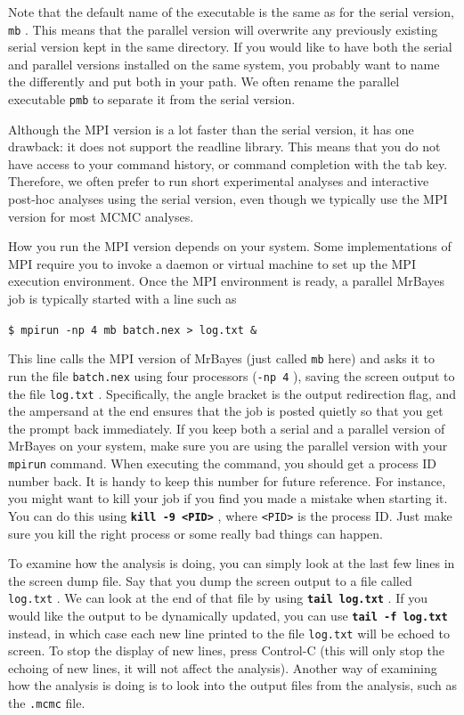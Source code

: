 \documentclass[12pt]{book}
\newcommand{\ttt}[1]{\texttt{#1} }
\newcommand{\tb}[1]{\texttt{\textbf{#1}} }
\begin{document}
Note that the default name of the executable is the same as for the serial version, \ttt{mb}. This means
that the parallel version will overwrite any previously existing serial version kept in the same directory. If you
would like to have both the serial and parallel versions installed on the same system, you probably want to
name the differently and put both in your path. We often rename the parallel executable \ttt{pmb} to
separate it from the serial version.

Although the MPI version is a lot faster than the serial version, it has one drawback: it does not support the readline
library. This means that you do not have access to your command history, or command completion with the tab key.
Therefore, we often prefer to run short experimental analyses and interactive post-hoc analyses using the serial
version, even though we typically use the MPI version for most MCMC analyses.

How you run the MPI version depends on your system. Some implementations of MPI 
require you to invoke a daemon or virtual machine to set up the MPI execution environment. Once the MPI
environment is ready, a parallel MrBayes job is typically started with a line such as

\ttt{\$ mpirun -np 4 mb batch.nex > log.txt \&}

This line calls the MPI version of MrBayes (just called \ttt{mb} here) and asks it to run the file
\ttt{batch.nex} using four processors (\ttt{-np 4}), saving the screen output to the file \ttt{log.txt}. Specifically,
the angle bracket is the output redirection flag, and the ampersand at the end ensures that the job is
posted quietly so that you get the prompt back immediately. If you keep both a serial and a parallel 
version of MrBayes on your system, make sure you are using the parallel version with your \ttt{mpirun} command.
When executing the command, you should get a process ID number back. It is handy to keep this number
for future reference. For instance, you might want to kill your job if you find you made a mistake when
starting it. You can do this using \tb{kill -9 <PID>}, where \ttt{<PID>} is the process ID. Just make sure
you kill the right process or some really bad things can happen.

To examine how the analysis is doing, you can simply look at the last few lines in the screen dump file.
Say that you dump the screen output to a file called \ttt{log.txt}. We can look at the end of that file by
using \tb{tail log.txt}. If you would like the output to be dynamically updated, you can use \tb{tail -f log.txt}
instead, in which case each new line printed to the file \ttt{log.txt} will be echoed to screen. To stop the
display of new lines, press Control-C (this will only stop the echoing of new lines, it will not affect the
analysis). Another way of examining how the analysis is doing is to look into the output files from the
analysis, such as the \ttt{.mcmc} file.
\end{document}
